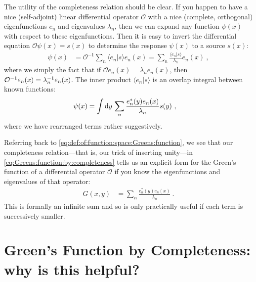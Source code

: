 The utility of the completeness relation should be clear. If you happen to have a nice (self-adjoint) linear differential operator $\mathcal O$ with a nice (complete, orthogonal) eigenfunctions $e_{n}$ and eigenvalues $\lambda_n$, then we can expand any function $\psi(x)$ with respect to these eigenfunctions. Then it is easy to invert the differential equation $\mathcal O \psi(x) = s(x)$ to determine the response $\psi(x)$ to a source $s(x)$:
\begin{align}
  \psi(x) 
  &= \mathcal O^{-1}
  \sum_n \langle e_{n}|s\rangle e_{n}(x)
  = \sum_n \frac{\langle e_{n}|s\rangle}{\lambda_n} e_{n}(x) \ ,
\end{align}
where we simply the fact that if $\mathcal O e_n(x) = \lambda_n e_n(x)$, then $\mathcal O^{-1} e_n(x) = \lambda_n^{-1} e_n(x)$. The inner product $\langle e_{n}|s\rangle$ is an overlap integral between known functions:
\begin{align}
  \psi(x) &= 
   \int \operatorname{d}\mkern-3mu^{}\mkern-1mu{y}\, \sum_n \frac{e_{n}^*(y) e_{n}(x)}{\lambda_n} s(y) \ ,
   \label{eq:Greens:function:by:completeness}
\end{align}
where we have rearranged terms rather suggestively. 

Referring back to \eqref{eq:def:of:function:space:Greens:function}, 
we see that our completeness relation---that is, our trick of inserting unity---in \eqref{eq:Greens:function:by:completeness} tells us an explicit form for the Green's function of a differential operator $\mathcal O$ if you know the eigenfunctions and eigenvalues of that operator:
\begin{align}
  G(x,y) &= \sum_n \frac{e_{n}^*(y) e_{n}(x)}{\lambda_n} \ .
  \label{eq:G:from:completeness}
\end{align}
This is formally an infinite sum and so is only practically useful if each term is successively smaller. 


\section{Green's Function by Completeness: why is this helpful?}
\label{sec:Greens:fuctions:by:completeness}

